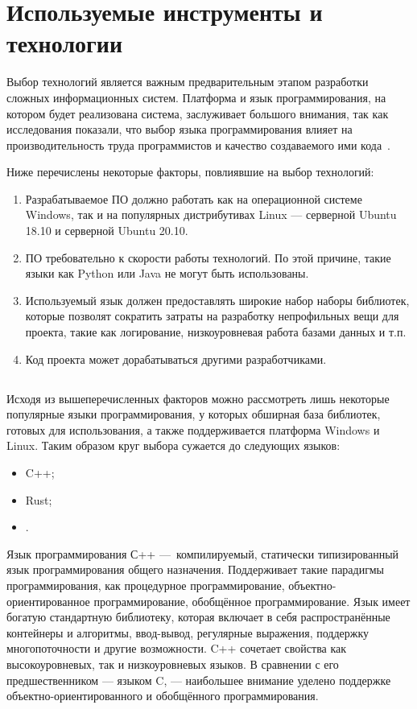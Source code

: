\section{Используемые инструменты и технологии}\label{sec:tools}

Выбор технологий является важным предварительным этапом разработки сложных информационных систем. Платформа и язык программирования, на котором будет реализована система, заслуживает большого внимания, так как исследования показали, что выбор языка программирования влияет на производительность труда программистов и качество создаваемого ими кода~\cite{code_complete}. %

Ниже перечислены некоторые факторы, повлиявшие на выбор технологий:
\begin{enumerate}
    \item Разрабатываемое ПО должно работать как на операционной системе Windows, так и на популярных дистрибутивах Linux — серверной Ubuntu 18.10 и серверной Ubuntu 20.10.
    \item ПО требовательно к скорости работы технологий. По этой причине, такие языки как Python или Java не могут быть использованы.
    \item Используемый язык должен предоставлять широкие набор наборы библиотек, которые позволят сократить затраты на разработку непрофильных вещи для проекта, такие как логирование, низкоуровневая работа базами данных и т.п.
    \item Код проекта может дорабатываться другими разработчиками.
\end{enumerate}

\subsection{\csharp}

Исходя из вышеперечисленных факторов можно рассмотреть лишь некоторые популярные языки программирования, у которых обширная база библиотек, готовых для использования, а также поддерживается платформа Windows и Linux. Таким образом круг выбора сужается до следующих языков:
\begin{itemize}
    \item C++;
    \item Rust;
    \item \csharp.
\end{itemize}

Язык программирования С++ — компилируемый, статически типизированный язык программирования общего назначения. Поддерживает такие парадигмы программирования, как процедурное программирование, объектно-ориентированное программирование, обобщённое программирование. Язык имеет богатую стандартную библиотеку, которая включает в себя распространённые контейнеры и алгоритмы, ввод-вывод, регулярные выражения, поддержку многопоточности и другие возможности. C++ сочетает свойства как высокоуровневых, так и низкоуровневых языков. В сравнении с его предшественником — языком C, — наибольшее внимание уделено поддержке объектно-ориентированного и обобщённого программирования.

